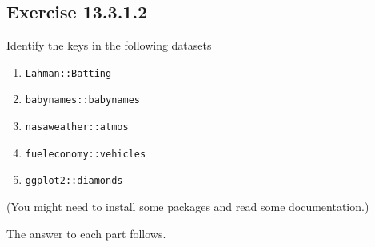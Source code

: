 \documentclass[]{book}
\providecommand{\tightlist}{%
  \setlength{\itemsep}{0pt}\setlength{\parskip}{0pt}}
\theoremstyle{plain}
\theoremstyle{remark}
\begin{document}
\hypertarget{exercise-13.3.1.2}{%
\subsection*{\texorpdfstring{Exercise {13.3.1.2}}{Exercise 13.3.1.2}}\label{exercise-13.3.1.2}}

Identify the keys in the following datasets

\begin{enumerate}
\def\labelenumi{\arabic{enumi}.}
\tightlist
\item
  \texttt{Lahman::Batting}
\item
  \texttt{babynames::babynames}
\item
  \texttt{nasaweather::atmos}
\item
  \texttt{fueleconomy::vehicles}
\item
  \texttt{ggplot2::diamonds}
\end{enumerate}

(You might need to install some packages and read some documentation.)

The answer to each part follows.
\end{document}
